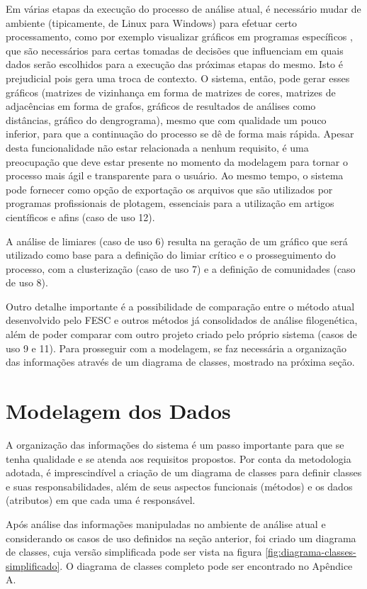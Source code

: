 Em várias etapas da execução do processo de análise atual, é necessário mudar de ambiente (tipicamente, de Linux para Windows) para efetuar certo processamento,
como por exemplo visualizar
gráficos em
programas específicos \cite{origin},
que são necessários para certas tomadas de decisões que influenciam em quais dados serão escolhidos para a execução das próximas etapas do mesmo. Isto é
prejudicial pois gera uma troca de contexto. O sistema, então, pode gerar esses gráficos (matrizes de vizinhança em forma de matrizes de cores, matrizes de
adjacências em forma de grafos, gráficos de resultados de análises como distâncias, gráfico do dengrograma), mesmo que com qualidade um pouco inferior,
para que a continuação do processo se dê de forma mais rápida. Apesar desta funcionalidade não estar relacionada a nenhum requisito, é
uma preocupação que deve estar presente no momento da modelagem para
tornar o processo mais ágil e transparente para o usuário. Ao mesmo tempo, o sistema pode fornecer como opção de exportação os arquivos que são utilizados por
programas profissionais de plotagem, essenciais para a utilização em artigos científicos e afins (caso de uso 12).

A análise de limiares (caso de uso 6) resulta na geração de um gráfico que será utilizado como base para a definição do limiar crítico e o prosseguimento
do processo, com a clusterização (caso de uso 7) e a definição de comunidades (caso de uso 8).

Outro detalhe importante é a possibilidade de comparação entre o método atual desenvolvido pelo FESC
e outros métodos já consolidados de análise filogenética,
além de poder comparar com outro projeto criado pelo próprio sistema (casos de uso 9 e 11).
Para prosseguir com a modelagem, se faz necessária a organização das informações através
de um diagrama de classes, mostrado na próxima seção.

\section{Modelagem dos Dados} \label{sec:organizacao}

A organização das informações do sistema é um passo importante para que se tenha qualidade e se atenda aos requisitos propostos. Por conta da metodologia
adotada, é imprescindível a criação de um diagrama de classes para definir classes e suas responsabilidades, além de seus aspectos funcionais (métodos)
e os dados
(atributos) em que cada uma é responsável.

Após análise das informações manipuladas no ambiente de análise atual e considerando os casos de uso definidos na seção anterior,
foi criado um diagrama de classes, cuja versão simplificada pode ser vista na figura
\ref{fig:diagrama-classes-simplificado}. O diagrama de classes completo pode ser encontrado no Apêndice A.

